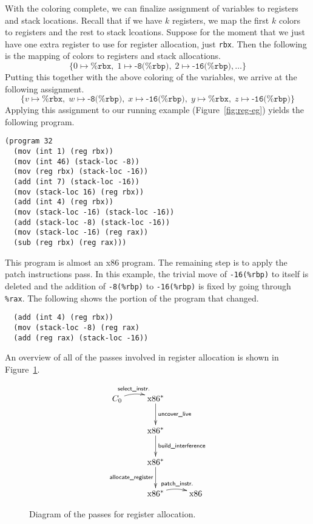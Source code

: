 \documentclass[12pt]{book}
\newcommand{\key}[1]{\texttt{#1}}
\begin{document}
With the coloring complete, we can finalize assignment of variables to
registers and stack locations. Recall that if we have $k$ registers,
we map the first $k$ colors to registers and the rest to stack
lcoations. Suppose for the moment that we just have one extra register
to use for register allocation, just \key{rbx}. Then the following is
the mapping of colors to registers and stack allocations.
\[
  \{ 0 \mapsto \key{\%rbx}, \; 1 \mapsto \key{-8(\%rbp)}, \; 2 \mapsto \key{-16(\%rbp)}, \ldots \}
\]
Putting this together with the above coloring of the variables, we
arrive at the following assignment.
\[
  \{ v \mapsto \key{\%rbx}, \;
  w \mapsto \key{-8(\%rbp)},  \;
  x \mapsto \key{-16(\%rbp)}, \;
  y \mapsto \key{\%rbx},  \;
  z\mapsto \key{-16(\%rbp)} \}
\]
Applying this assignment to our running example
(Figure~\ref{fig:reg-eg}) yields the following program.
\begin{lstlisting}
(program 32
  (mov (int 1) (reg rbx))
  (mov (int 46) (stack-loc -8))
  (mov (reg rbx) (stack-loc -16))
  (add (int 7) (stack-loc -16))
  (mov (stack-loc 16) (reg rbx))
  (add (int 4) (reg rbx))
  (mov (stack-loc -16) (stack-loc -16))
  (add (stack-loc -8) (stack-loc -16))
  (mov (stack-loc -16) (reg rax))
  (sub (reg rbx) (reg rax)))
\end{lstlisting}
This program is almost an x86 program. The remaining step is to apply
the patch instructions pass. In this example, the trivial move of
\key{-16(\%rbp)} to itself is deleted and the addition of
\key{-8(\%rbp)} to \key{-16(\%rbp)} is fixed by going through
\key{\%rax}. The following shows the portion of the program that
changed.
\begin{lstlisting}
  (add (int 4) (reg rbx))
  (mov (stack-loc -8) (reg rax)
  (add (reg rax) (stack-loc -16))
\end{lstlisting}
An overview of all of the passes involved in register allocation is
shown in Figure~\ref{fig:reg-alloc-passes}.

\begin{figure}[tbp]
\[
\xymatrix{
  C_0 \ar@/^/[r]^-{\textsf{select\_instr.}}
    & \text{x86}^{*} \ar[d]^-{\textsf{uncover\_live}} \\
    & \text{x86}^{*} \ar[d]^-{\textsf{build\_interference}} \\
    & \text{x86}^{*} \ar[d]_-{\textsf{allocate\_register}} \\
    & \text{x86}^{*} \ar@/^/[r]^-{\textsf{patch\_instr.}} 
    & \text{x86} 
}
\]
\caption{Diagram of the passes for register allocation.}
\label{fig:reg-alloc-passes}
\end{figure}
\end{document}
